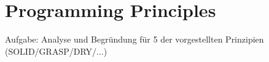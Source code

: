 \chapter{Programming Principles}
Aufgabe: Analyse und Begründung für 5 der vorgestellten Prinzipien (SOLID/GRASP/DRY/...)